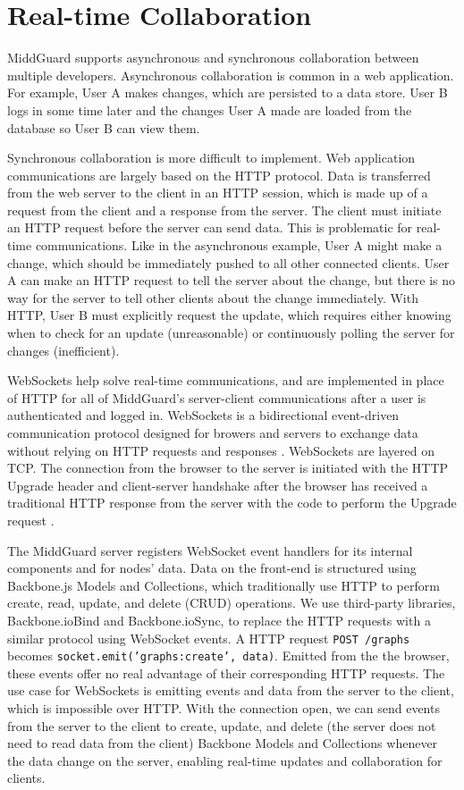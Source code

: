 \documentclass[midd]{thesis}
\begin{document}
\section{Real-time Collaboration}

MiddGuard supports asynchronous and synchronous collaboration between multiple
developers. Asynchronous collaboration is common in a web application. For
example, User A makes changes, which are persisted to a data store. User B logs
in some time later and the changes User A made are loaded from the database so
User B can view them.

Synchronous collaboration is more difficult to implement. Web application
communications are largely based on the HTTP protocol. Data is transferred from
the web server to the client in an HTTP session, which is made up of a request
from the client and a response from the server. The client must initiate an HTTP
request before the server can send data. This is problematic for real-time
communications. Like in the asynchronous example, User A might make a change,
which should be immediately pushed to all other connected clients. User A can
make an HTTP request to tell the server about the change, but there is no way
for the server to tell other clients about the change immediately. With HTTP,
User B must explicitly request the update, which requires either knowing when to
check for an update (unreasonable) or continuously polling the server for
changes (inefficient).

WebSockets help solve real-time communications, and are implemented in place of
HTTP for all of MiddGuard's server-client communications after a user is
authenticated and logged in. WebSockets is a bidirectional event-driven
communication protocol designed for browers and servers to exchange data without
relying on HTTP requests and responses \cite{mdn-websockets}. WebSockets are
layered on TCP. The connection from the browser to the server is initiated with
the HTTP Upgrade header and client-server handshake after the browser has
received a traditional HTTP response from the server with the code to perform
the Upgrade request \cite{RFC6455}.

The MiddGuard server registers WebSocket event handlers for its internal
components and for nodes' data. Data on the front-end is structured using
Backbone.js Models and Collections, which traditionally use HTTP to perform
create, read, update, and delete (CRUD) operations. We use third-party
libraries, Backbone.ioBind and Backbone.ioSync, to replace the HTTP requests
with a similar protocol using WebSocket events. A HTTP request \texttt{POST
/graphs} becomes \texttt{socket.emit('graphs:create', data)}. Emitted from the
the browser, these events offer no real advantage of their corresponding HTTP
requests. The use case for WebSockets is emitting events and data from the
server to the client, which is impossible over HTTP. With the connection open,
we can send events from the server to the client to create, update, and delete
(the server does not need to read data from the client) Backbone Models and
Collections whenever the data change on the server, enabling real-time updates
and collaboration for clients.
\end{document}

